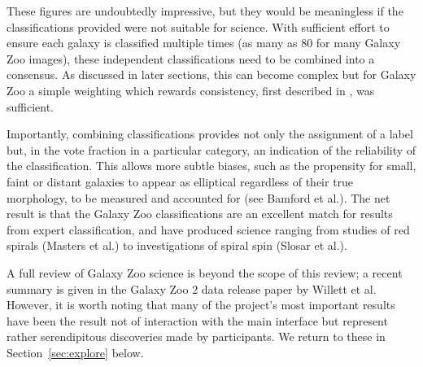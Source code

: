 \documentclass{ar2e}
\begin{document}
These figures are undoubtedly impressive, but they would be meaningless if the
classifications provided were not suitable for science. With sufficient effort
to ensure each galaxy is classified multiple times (as many as 80 for many
Galaxy Zoo images), these independent classifications need to be combined into a
consensus. As discussed in later sections, this can become complex but for
Galaxy Zoo a simple weighting which rewards consistency, first described in
\citet{Land++}, was sufficient. 


Importantly, combining classifications provides not only the assignment of a
label but, in the vote fraction in a particular category, an indication of the
reliability of the classification. This allows more subtle biases, such as the
propensity for small, faint or distant galaxies to appear as elliptical
regardless of their true morphology, to be measured and accounted for (see
Bamford et al.). The net result is that the Galaxy Zoo classifications are an
excellent match for results from expert classification, and have produced
science ranging from studies of red spirals (Masters et al.) to investigations
of spiral spin (Slosar et al.).


A full review of Galaxy Zoo science is beyond the scope of this review; a
recent summary is given in the Galaxy Zoo 2 data release paper by Willett et
al. However, it is worth noting that many of the project's most important
results have been the result not of interaction with the main interface but
represent rather serendipitous discoveries made by participants. We return to
these in Section~\ref{sec:explore} below.



\end{document}
